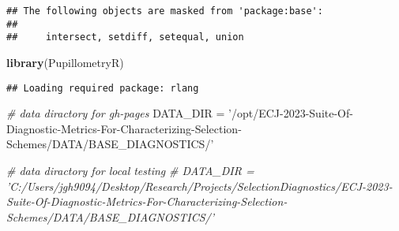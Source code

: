 \documentclass[]{book}
\newenvironment{Shaded}{\begin{snugshade}}{\end{snugshade}}
\newcommand{\CommentTok}[1]{\textcolor[rgb]{0.56,0.35,0.01}{\textit{#1}}}
\newcommand{\KeywordTok}[1]{\textcolor[rgb]{0.13,0.29,0.53}{\textbf{#1}}}
\newcommand{\NormalTok}[1]{#1}
\newcommand{\StringTok}[1]{\textcolor[rgb]{0.31,0.60,0.02}{#1}}
\begin{document}
\begin{verbatim}
## The following objects are masked from 'package:base':
## 
##     intersect, setdiff, setequal, union
\end{verbatim}

\begin{Shaded}
\begin{Highlighting}[]
\KeywordTok{library}\NormalTok{(PupillometryR)}
\end{Highlighting}
\end{Shaded}

\begin{verbatim}
## Loading required package: rlang
\end{verbatim}

\begin{Shaded}
\begin{Highlighting}[]
\CommentTok{# data diractory for gh-pages}
\NormalTok{DATA_DIR =}\StringTok{ '/opt/ECJ-2023-Suite-Of-Diagnostic-Metrics-For-Characterizing-Selection-Schemes/DATA/BASE_DIAGNOSTICS/'}

\CommentTok{# data diractory for local testing}
\CommentTok{# DATA_DIR = 'C:/Users/jgh9094/Desktop/Research/Projects/SelectionDiagnostics/ECJ-2023-Suite-Of-Diagnostic-Metrics-For-Characterizing-Selection-Schemes/DATA/BASE_DIAGNOSTICS/'}


\end{Highlighting}
\end{Shaded}
\end{document}
